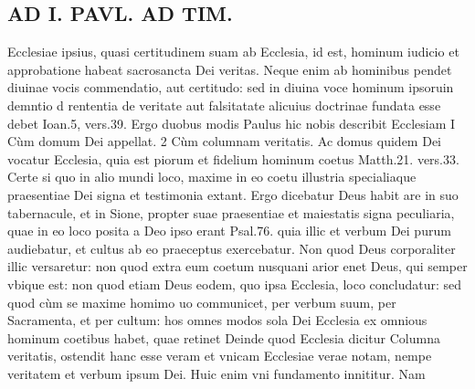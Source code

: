 \documentclass{article}
\begin{document}
\begin{pages}
\section*{AD I. PAVL. AD TIM. }
\marginpar{[ p.172 ]}\pstart Ecclesiae ipsius, quasi certitudinem suam ab Ecclesia, id est, hominum iudicio et approbatione habeat sacrosancta Dei veritas. Neque enim ab hominibus pendet diuinae vocis commendatio, aut certitudo: sed in diuina voce hominum ipsoruin demntio d rententia de veritate aut falsitatate alicuius doctrinae fundata esse debet Ioan.5, vers.39.  \pend\pstart Ergo duobus modis Paulus hic nobis describit Ecclesiam I Cùm domum Dei appellat. 2 Cùm columnam veritatis. Ac domus quidem Dei vocatur Ecclesia, quia est piorum et fidelium hominum coetus Matth.21. vers.33. Certe si quo in alio mundi loco, maxime in eo coetu illustria specialiaque praesentiae Dei signa et testimonia extant. Ergo dicebatur Deus habit are in suo tabernacule, et in Sione, propter suae praesentiae et maiestatis signa peculiaria, quae in eo loco posita a Deo ipso erant Psal.76. quia illic et verbum Dei purum audiebatur, et cultus ab eo praeceptus exercebatur. Non quod Deus corporaliter illic versaretur: non quod extra eum coetum nusquani arior enet Deus, qui semper vbique est: non quod etiam Deus eodem, quo ipsa Ecclesia, loco concludatur: sed quod cùm se maxime homimo uo communicet, per verbum suum, per Sacramenta, et per cultum: hos omnes modos sola Dei Ecclesia ex omnious hominum coetibus habet, quae retinet  \pend\pstart Deinde quod Ecclesia dicitur Columna veritatis, ostendit hanc esse veram et vnicam Ecclesiae verae notam, nempe veritatem et verbum ipsum Dei. Huic enim vni fundamento innititur. Nam  \pend

\end{pages}
\end{document}
